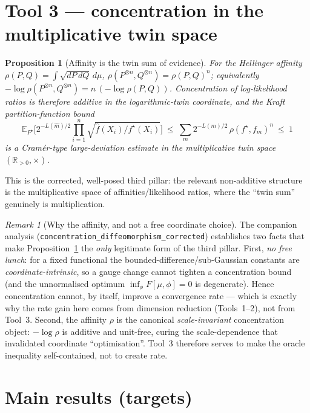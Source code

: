 \documentclass[11pt]{article}
\theoremstyle{plain}
\newtheorem{proposition}[theorem]{Proposition}
\theoremstyle{definition}
\theoremstyle{remark}
\newtheorem{remark}[theorem]{Remark}
\newcommand{\R}{\mathbb{R}}
\newcommand{\E}{\mathbb{E}}
\begin{document}
\section{Tool 3 --- concentration in the multiplicative twin space}

\begin{proposition}[Affinity is the twin sum of evidence]\label{prop:affinity}
For the Hellinger affinity $\rho(P,Q)=\int\sqrt{dP\,dQ}\,d\mu$,
$\rho(P^{\otimes n},Q^{\otimes n})=\rho(P,Q)^n$; equivalently
$-\log\rho(P^{\otimes n},Q^{\otimes n})=n\,(-\log\rho(P,Q))$. Concentration of
log-likelihood ratios is therefore additive in the logarithmic-twin coordinate,
and the Kraft partition-function bound
\[
\E_{P^\star}\!\Big[2^{-L(\widehat m)/2}\textstyle\prod_{i=1}^n
\sqrt{\widehat f(X_i)/f^\star(X_i)}\Big]\ \le\ \sum_m 2^{-L(m)/2}\,\rho(f^\star,f_m)^n\ \le\ 1
\]
is a Cram\'er-type large-deviation estimate in the multiplicative twin space
$(\R_{>0},\times)$.
\end{proposition}

This is the corrected, well-posed third pillar: the relevant non-additive
structure is the multiplicative space of affinities/likelihood ratios, where the
``twin sum'' genuinely is multiplication.

\begin{remark}[Why the affinity, and not a free coordinate choice]\label{rem:nofreelunch}
The companion analysis (\texttt{concentration\_diffeomorphism\_corrected})
establishes two facts that make Proposition~\ref{prop:affinity} the \emph{only}
legitimate form of the third pillar. First, \emph{no free lunch}: for a fixed
functional the bounded-difference/sub-Gaussian constants are
\emph{coordinate-intrinsic}, so a gauge change cannot tighten a concentration
bound (and the unnormalised optimum $\inf_\phi F[\mu,\phi]=0$ is degenerate).
Hence concentration cannot, by itself, improve a convergence rate --- which is
exactly why the rate gain here comes from dimension reduction (Tools~1--2), not
from Tool~3. Second, the affinity $\rho$ is the canonical \emph{scale-invariant}
concentration object: $-\log\rho$ is additive and unit-free, curing the
scale-dependence that invalidated coordinate ``optimisation''. Tool~3 therefore
serves to make the oracle inequality self-contained, not to create rate.
\end{remark}

\section{Main results (targets)}
\end{document}
